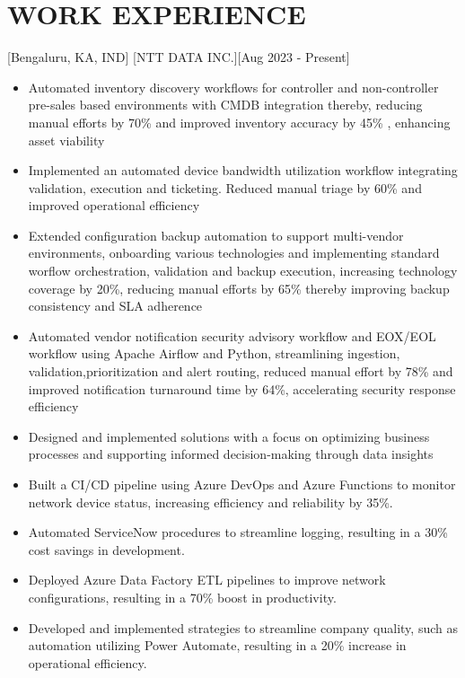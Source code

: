 \documentclass{article}
\begin{document}
\section{WORK EXPERIENCE}


[Bengaluru, KA, IND]
[NTT DATA INC.][\normalfont Aug 2023 - Present]
\begin{itemize}
\item Automated inventory discovery workflows for controller and non-controller pre-sales based environments with CMDB integration thereby, reducing manual efforts by 70\% and improved inventory accuracy by 45\% , enhancing asset viability
\item Implemented an automated device bandwidth utilization workflow integrating validation, execution and ticketing. Reduced manual triage by 60\% and improved operational efficiency
\item Extended configuration backup automation to support multi-vendor environments, onboarding various technologies and implementing standard worflow orchestration, validation and backup execution, increasing technology coverage by 20\%, reducing manual efforts by 65\% thereby improving backup consistency and SLA adherence 
\item Automated vendor notification security advisory workflow and EOX/EOL workflow using Apache Airflow and Python, streamlining ingestion, validation,prioritization and alert routing, reduced manual effort by 78\% and improved notification turnaround time by 64\%, accelerating security response efficiency
\item Designed and implemented solutions with a focus on optimizing business processes and supporting informed decision-making through data insights
\item  Built a CI/CD pipeline using Azure DevOps and Azure Functions to monitor network device status, increasing efficiency and reliability by 35\%.
\item  Automated ServiceNow procedures to streamline logging, resulting in a 30\% cost savings in development.
\item  Deployed Azure Data Factory ETL pipelines to improve network configurations, resulting in a 70\% boost in productivity.

\item  Developed and implemented strategies to streamline company quality, such as automation utilizing Power Automate, resulting in a 20\% increase in operational efficiency.


\end{itemize}
\end{document}
